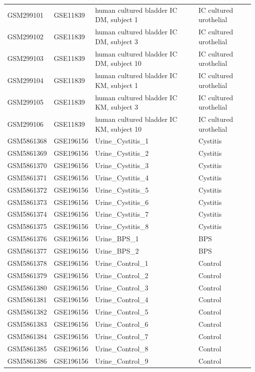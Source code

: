 \begin{longtable}{llp{}l}
GSM299101 & GSE11839 & human cultured bladder IC DM, subject 1 & IC cultured urothelial \\
GSM299102 & GSE11839 & human cultured bladder IC DM, subject 3 & IC cultured urothelial \\
GSM299103 & GSE11839 & human cultured bladder IC DM, subject 10 & IC cultured urothelial \\
GSM299104 & GSE11839 & human cultured bladder IC KM, subject 1 & IC cultured urothelial \\
GSM299105 & GSE11839 & human cultured bladder IC KM, subject 3 & IC cultured urothelial \\
GSM299106 & GSE11839 & human cultured bladder IC KM, subject 10 & IC cultured urothelial \\
GSM5861368 & GSE196156 & Urine\_Cystitis\_1 & Cystitis \\
GSM5861369 & GSE196156 & Urine\_Cystitis\_2 & Cystitis \\
GSM5861370 & GSE196156 & Urine\_Cystitis\_3 & Cystitis \\
GSM5861371 & GSE196156 & Urine\_Cystitis\_4 & Cystitis \\
GSM5861372 & GSE196156 & Urine\_Cystitis\_5 & Cystitis \\
GSM5861373 & GSE196156 & Urine\_Cystitis\_6 & Cystitis \\
GSM5861374 & GSE196156 & Urine\_Cystitis\_7 & Cystitis \\
GSM5861375 & GSE196156 & Urine\_Cystitis\_8 & Cystitis \\
GSM5861376 & GSE196156 & Urine\_BPS\_1 & BPS \\
GSM5861377 & GSE196156 & Urine\_BPS\_2 & BPS \\
GSM5861378 & GSE196156 & Urine\_Control\_1 & Control \\
GSM5861379 & GSE196156 & Urine\_Control\_2 & Control \\
GSM5861380 & GSE196156 & Urine\_Control\_3 & Control \\
GSM5861381 & GSE196156 & Urine\_Control\_4 & Control \\
GSM5861382 & GSE196156 & Urine\_Control\_5 & Control \\
GSM5861383 & GSE196156 & Urine\_Control\_6 & Control \\
GSM5861384 & GSE196156 & Urine\_Control\_7 & Control \\
GSM5861385 & GSE196156 & Urine\_Control\_8 & Control \\
GSM5861386 & GSE196156 & Urine\_Control\_9 & Control \\

\end{longtable}
